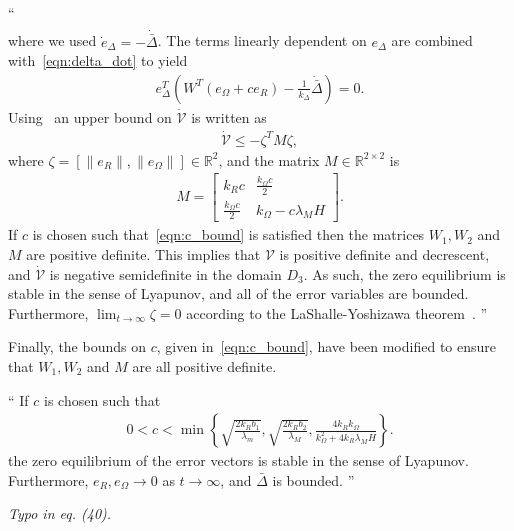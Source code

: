 \documentclass[11pt]{article}
\newcommand{\braces}[1]{\ensuremath{\left\{ #1 \right\}}}
\newcommand{\parenth}[1]{\ensuremath{\left( #1 \right)}}
\newcommand{\R}{\ensuremath{\mathbb{R}}}
\newenvironment{correction}{\begin{list}{}{\setlength{\leftmargin}{1cm}\setlength{\rightmargin}{1cm}}\vspace{\parsep}\item[]``}{''\end{list}}
\begin{document}
\begin{enumerate}
\begin{correction}
\begin{align}
    \end{align}
    where we used \( \dot{e}_\Delta = - \dot{\bar{\Delta}} \).
    The terms linearly dependent on \( e_\Delta\) are combined with~\cref{eqn:delta_dot} to yield
    \begin{align*}
     e_\Delta^T \parenth{W^T \parenth{e_\Omega + c e_R} - \frac{1}{k_\Delta} \dot{\bar{\Delta}}} = 0 . 
    \end{align*}
    Using~ an upper bound on \( \dot{\mathcal{V}} \) is written as
    \begin{gather*}
    \dot{\mathcal{V}} \leq -\zeta^T M \zeta ,
    \end{gather*}
    where $\zeta=[\|e_R\|,\|e_\Omega\|]\in\R^2$, and the matrix \( M \in \R^{2 \times 2} \) is 
    \begin{gather*}
    M = \begin{bmatrix}
        k_R c & \frac{k_\Omega c}{2} \\
        \frac{k_\Omega c}{2} & k_\Omega - c \lambda_M H
    \end{bmatrix} .
    \end{gather*}
    If \( c \) is chosen such that~\cref{eqn:c_bound} is satisfied then the matrices \( W_1, W_2 \) and \( M \) are positive definite.
    This implies that $\mathcal{V}$ is positive definite and decrescent, and $\dot{\mathcal{V}}$ is negative semidefinite in the domain $D_3$. As such, the zero equilibrium is stable in the sense of Lyapunov, and all of the error variables are bounded. Furthermore, $\lim_{t\to\infty} \zeta=0$ according to the LaShalle-Yoshizawa theorem~\cite{khalil1996}. 
\end{correction}

Finally, the bounds on \( c \), given in~\cref{eqn:c_bound}, have been modified to ensure that \( W_1, W_2\) and \( M \) are all positive definite.
\begin{correction}
    If \( c \) is chosen such that
    \begin{gather}
        0 < c < \min \braces{\sqrt{\frac{2 k_R b_1}{\lambda_m}},\sqrt{\frac{2 k_R b_2}{\lambda_M}}, \frac{4 k_R k_\Omega}{k_\Omega^2 + 4 k_R \lambda_M H}} .
    \end{gather}
    the zero equilibrium of the error vectors is stable in the sense of Lyapunov. Furthermore, $e_R,e_\Omega\rightarrow 0$ as $t\rightarrow\infty$, and $\bar\Delta$ is  bounded.
\end{correction}
\item \textit{Typo in eq. (40).}


\end{enumerate}
\end{document}
